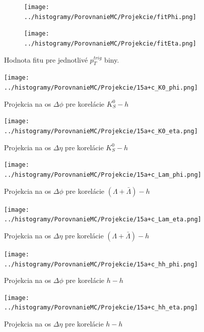 \documentclass[thesismargins, thesislinespacing]{rnthesis}
\begin{document}
\begin{figure}
	\centering
	\begin{subfigure}{0.5\textwidth}
		\centering
		\texttt{[image: ../histogramy/PorovnanieMC/Projekcie/fitPhi.png]}
		\caption{}
		\label{fitPhi}
	\end{subfigure}%
	\begin{subfigure}{0.5\textwidth}
		\centering
		\texttt{[image: ../histogramy/PorovnanieMC/Projekcie/fitEta.png]}
		\caption{}
		\label{fitEta}
	\end{subfigure}
	\caption{Hodnota fitu pre jednotlivé $p_{T}^{trig}$ biny.}
	\label{fitMC}
\end{figure}

\begin{figure}
	\centering
	\texttt{[image: ../histogramy/PorovnanieMC/Projekcie/15a+c\_K0\_phi.png]}
	\caption{Projekcia na os $\Delta \phi$ pre korelácie $K^0_S - h$}
	\label{K0phi}
\end{figure}

\begin{figure}
	\centering
	\texttt{[image: ../histogramy/PorovnanieMC/Projekcie/15a+c\_K0\_eta.png]}
	\caption{Projekcia na os $\Delta \eta$ pre korelácie $K^0_S - h$}
	\label{K0eta}
\end{figure}
\begin{figure}
\centering
\texttt{[image: ../histogramy/PorovnanieMC/Projekcie/15a+c\_Lam\_phi.png]}
\caption{Projekcia na os $\Delta \phi$ pre korelácie $(\Lambda + \bar{\Lambda})- h$}
\label{Lamphi}
\end{figure}
\begin{figure}
	\centering
	\texttt{[image: ../histogramy/PorovnanieMC/Projekcie/15a+c\_Lam\_eta.png]}
	\caption{Projekcia na os $\Delta \eta$ pre korelácie $(\Lambda + \bar{\Lambda})- h$}
	\label{Lameta}
\end{figure}

\begin{figure}
	\centering
	\texttt{[image: ../histogramy/PorovnanieMC/Projekcie/15a+c\_hh\_phi.png]}
	\caption{Projekcia na os $\Delta \phi$ pre korelácie $h - h$}
	\label{hphi}
\end{figure}

\begin{figure}
	\centering
	\texttt{[image: ../histogramy/PorovnanieMC/Projekcie/15a+c\_hh\_eta.png]}
	\caption{Projekcia na os $\Delta \eta$ pre korelácie $h - h$}
	\label{heta}
\end{figure}
\end{document}
